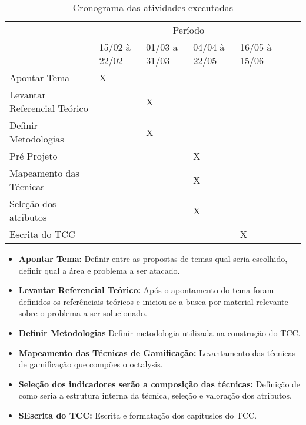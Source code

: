 \begin{table}[!htpb]
\centering

\begin{small} 
  
\setlength{\tabcolsep}{3pt} 


\begin{tabular}{|l|l|l|l|l|l|l|}\hline
 & \multicolumn{4}{c|}{Período}\\ \cline{2-5}
\raisebox{1.5ex}{Etapa} & 15/02 à 22/02 & 01/03 a 31/03 & 04/04 à 22/05 & 16/05 à 15/06 \\ \hline

Apontar Tema & X & & & \\ \hline
Levantar Referencial Teórico &  & X & & \\ \hline
Definir Metodologias & & X & & \\ \hline
Pré Projeto & & & X & \\ \hline
Mapeamento das Técnicas & & & X &\\ \hline
Seleção dos atributos & & & X & \\ \hline
Escrita do TCC & &  &  & X & & \\ \hline

\end{tabular} 
\end{small}
\caption{Cronograma das atividades executadas}
\label{t_cronograma}
\end{table} 

\begin{itemize}
\item  \textbf {Apontar Tema:} Definir entre as propostas de temas qual seria escolhido,  definir qual a área e problema a ser atacado.
\item  \textbf {Levantar Referencial Teórico:} Após o apontamento do tema foram definidos os referênciais teóricos e iniciou-se a busca por material relevante sobre o problema a ser solucionado.
\item  \textbf {Definir Metodologias} Definir metodologia utilizada na construção do TCC.
\item  \textbf {Mapeamento das Técnicas de Gamificação:} Levantamento das técnicas de gamificação que compões o octalysis.
\item  \textbf {Seleção dos indicadores serão a composição das técnicas:} Definição de como seria a estrutura interna da técnica, seleção e valoração dos atributos.
\item  \textbf{SEscrita do TCC:} Escrita e formatação dos capítuslos do TCC.
\end{itemize}




